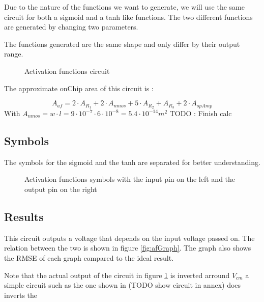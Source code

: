 Due to the nature of the functions we want to generate, we will use the same circuit for both a sigmoid and a \ac{tanh} like functions. The two different functions are generated by changing two parameters.

The functions generated are the same shape and only differ by their output range.

\begin{figure}[H]
  \centering
  
  \caption{Activation functions circuit}
  \label{fig:afCircuit}
\end{figure}

The approximate onChip area of this circuit is :

\begin{equation}
  A_{af}=2\cdot A_{R_1} + 2\cdot A_{nmos} + 5\cdot A_{R_2} + A_{R_3} +2\cdot A_{opAmp}
\end{equation}
With $A_{nmos} = w\cdot l = 9\cdot 10^{-7} \cdot 6 \cdot 10^{-8} = 5.4 \cdot 10^{-14} m^2$
TODO : Finish calc



\subsection{Symbols}
The symbols for the sigmoid and the \ac{tanh} are separated for better understanding.

\begin{figure}[H]
  \centering
  \hspace*{0.8cm}
  \hfill
  \hspace*{0.8cm}
  \caption{Activation functions symbols with the input pin on the left and the output pin on the right}
  \label{fig:afSymbol}
\end{figure}

\subsection{Results}

This circuit outputs a voltage that depends on the input voltage passed on. The relation between the two is shown in figure \ref{fig:afGraph}. The graph also shows the \ac{RMSE} of each graph compared to the ideal result.

Note that the actual output of the circuit in figure \ref{fig:afCircuit} is inverted arround $V_{cm}$ a simple circuit such as the one shown in  (TODO show circuit in annex) does inverts the

